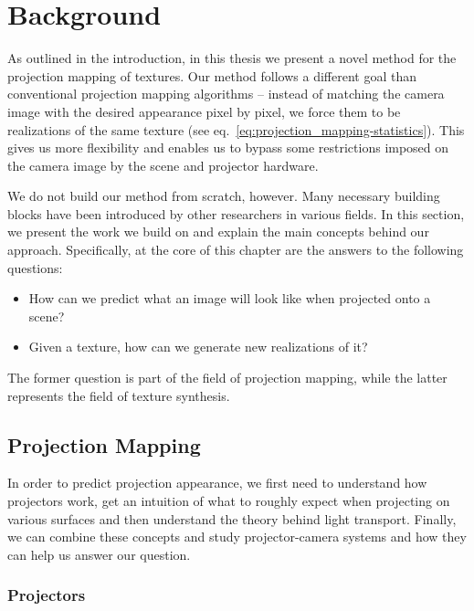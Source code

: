 \chapter{Background}
\label{chapter:background} 

As outlined in the introduction, in this thesis we present a novel method for the projection mapping of textures. Our method follows a different goal than conventional projection mapping algorithms -- instead of matching the camera image with the desired appearance pixel by pixel, we force them to be realizations of the same texture (see eq.~\ref{eq:projection_mapping-statistics}). This gives us more flexibility and enables us to bypass some restrictions imposed on the camera image by the scene and projector hardware.

We do not build our method from scratch, however. Many necessary building blocks have been introduced by other researchers in various fields. In this section, we present the work we build on and explain the main concepts behind our approach. Specifically, at the core of this chapter are the answers to the following questions:

\begin{itemize}
    \item How can we predict what an image will look like when projected onto a scene?
    \item Given a texture, how can we generate new realizations of it?
\end{itemize}

The former question is part of the field of projection mapping, while the latter represents the field of texture synthesis.

\section{Projection Mapping}
\label{section:background-projection_mapping}

In order to predict projection appearance, we first need to understand how projectors work, get an intuition of what to roughly expect when projecting on various surfaces and then understand the theory behind light transport. Finally, we can combine these concepts and study projector-camera systems and how they can help us answer our question.

\subsection{Projectors}
\label{section:background-projection_mapping-projectors}


